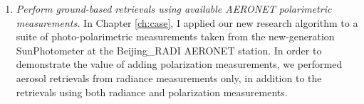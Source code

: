 \begin{enumerate}
\item \textit{Perform ground-based retrievals using available AERONET
polarimetric measurements.}
\newline
In Chapter \ref{ch:case}, I applied our new research algorithm to a suite of
photo-polarimetric measurements taken from the new-generation SunPhotometer
at the Beijing\_RADI AERONET station. In order to demonstrate the value of 
adding polarization measurements, we performed aerosol retrievals from 
radiance measurements only, in addition to the retrievals using both radiance 
and polarization measurements. 
\end{enumerate}
